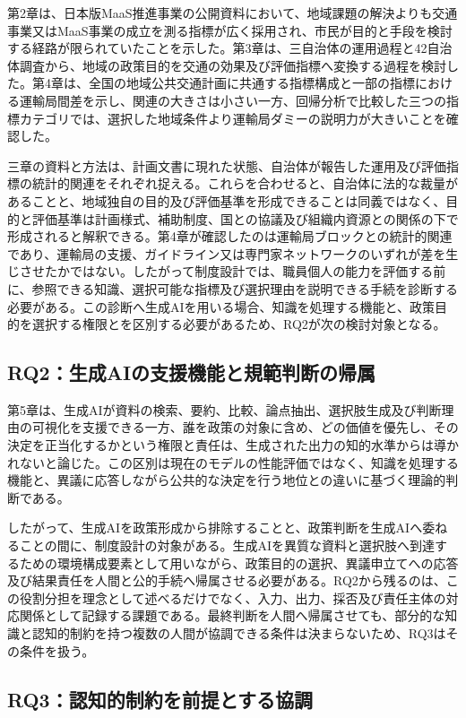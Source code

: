 第2章は、日本版MaaS推進事業の公開資料において、地域課題の解決よりも交通事業又はMaaS事業の成立を測る指標が広く採用され、市民が目的と手段を検討する経路が限られていたことを示した。第3章は、三自治体の運用過程と42自治体調査から、地域の政策目的を交通の効果及び評価指標へ変換する過程を検討した。第4章は、全国の地域公共交通計画に共通する指標構成と一部の指標における運輸局間差を示し、関連の大きさは小さい一方、回帰分析で比較した三つの指標カテゴリでは、選択した地域条件より運輸局ダミーの説明力が大きいことを確認した。

三章の資料と方法は、計画文書に現れた状態、自治体が報告した運用及び評価指標の統計的関連をそれぞれ捉える。これらを合わせると、自治体に法的な裁量があることと、地域独自の目的及び評価基準を形成できることは同義ではなく、目的と評価基準は計画様式、補助制度、国との協議及び組織内資源との関係の下で形成されると解釈できる。第4章が確認したのは運輸局ブロックとの統計的関連であり、運輸局の支援、ガイドライン又は専門家ネットワークのいずれが差を生じさせたかではない。したがって制度設計では、職員個人の能力を評価する前に、参照できる知識、選択可能な指標及び選択理由を説明できる手続を診断する必要がある。この診断へ生成AIを用いる場合、知識を処理する機能と、政策目的を選択する権限とを区別する必要があるため、RQ2が次の検討対象となる。

\subsection{RQ2：生成AIの支援機能と規範判断の帰属}

第5章は、生成AIが資料の検索、要約、比較、論点抽出、選択肢生成及び判断理由の可視化を支援できる一方、誰を政策の対象に含め、どの価値を優先し、その決定を正当化するかという権限と責任は、生成された出力の知的水準からは導かれないと論じた。この区別は現在のモデルの性能評価ではなく、知識を処理する機能と、異議に応答しながら公共的な決定を行う地位との違いに基づく理論的判断である。

したがって、生成AIを政策形成から排除することと、政策判断を生成AIへ委ねることの間に、制度設計の対象がある。生成AIを異質な資料と選択肢へ到達するための環境構成要素として用いながら、政策目的の選択、異議申立てへの応答及び結果責任を人間と公的手続へ帰属させる必要がある。RQ2から残るのは、この役割分担を理念として述べるだけでなく、入力、出力、採否及び責任主体の対応関係として記録する課題である。最終判断を人間へ帰属させても、部分的な知識と認知的制約を持つ複数の人間が協調できる条件は決まらないため、RQ3はその条件を扱う。

\subsection{RQ3：認知的制約を前提とする協調}

